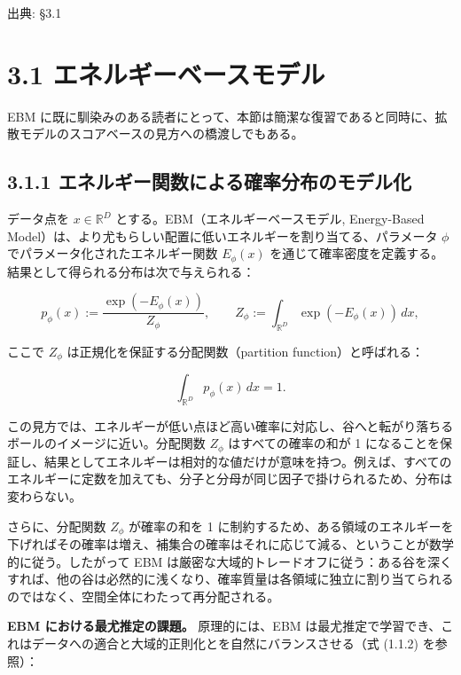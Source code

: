 

{\color{gray}\footnotesize 出典: §3.1\par}
\vspace{0.2em}
\section*{3.1 エネルギーベースモデル}



EBM に既に馴染みのある読者にとって、本節は簡潔な復習であると同時に、拡散モデルのスコアベースの見方への橋渡しでもある。

\subsection*{3.1.1 エネルギー関数による確率分布のモデル化}


データ点を $x \in \mathbb{R}^D$ とする。EBM（エネルギーベースモデル, Energy-Based Model）は、より尤もらしい配置に低いエネルギーを割り当てる、パラメータ $\phi$ でパラメータ化されたエネルギー関数 $E_\phi(x)$ を通じて確率密度を定義する。結果として得られる分布は次で与えられる：

\[
p_\phi(x) := \frac{\exp(-E_\phi(x))}{Z_\phi}, \qquad Z_\phi := \int_{\mathbb{R}^D} \exp(-E_\phi(x))\, dx,
\]


ここで $Z_\phi$ は正規化を保証する分配関数（partition function）と呼ばれる：

\[
\int_{\mathbb{R}^D} p_\phi(x)\, dx = 1.
\]




この見方では、エネルギーが低い点ほど高い確率に対応し、谷へと転がり落ちるボールのイメージに近い。分配関数 $Z_\phi$ はすべての確率の和が 1 になることを保証し、結果としてエネルギーは相対的な値だけが意味を持つ。例えば、すべてのエネルギーに定数を加えても、分子と分母が同じ因子で掛けられるため、分布は変わらない。

さらに、分配関数 $Z_\phi$ が確率の和を 1 に制約するため、ある領域のエネルギーを下げればその確率は増え、補集合の確率はそれに応じて減る、ということが数学的に従う。したがって EBM は厳密な大域的トレードオフに従う：ある谷を深くすれば、他の谷は必然的に浅くなり、確率質量は各領域に独立に割り当てられるのではなく、空間全体にわたって再分配される。

\textbf{EBM における最尤推定の課題。} 原理的には、EBM は最尤推定で学習でき、これはデータへの適合と大域的正則化とを自然にバランスさせる（式 (1.1.2) を参照）：

